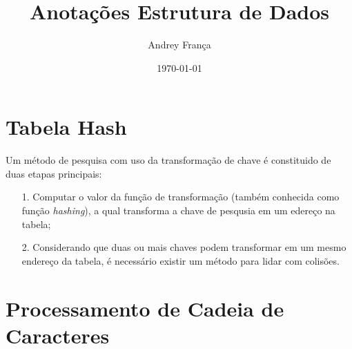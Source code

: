 \documentclass[10pt,a4paper]{article}
\author{Andrey França}
\title{Anotações Estrutura de Dados}
\date{\today}
\begin{document}
\maketitle

\section{Tabela Hash}

Um método de pesquisa com uso da transformação de chave é constituido de duas etapas principais:

\begin{itemize}

	\item[1.] Computar o valor da função de transformação (também conhecida como função 
	\textit{hashing}), a qual transforma a chave de pesqusia em um edereço na tabela;
	
	\item[2.] Considerando que duas ou mais chaves podem transformar em um mesmo endereço 
	da tabela, é necessário existir um método para lidar  com colisões.
	
\end{itemize}

\section{Processamento de Cadeia de Caracteres}
\end{document}
